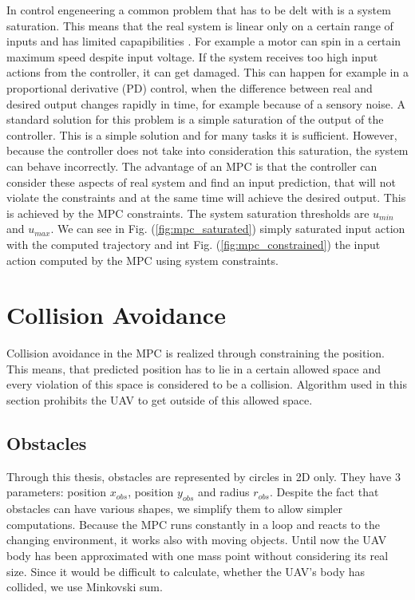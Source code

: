 \documentclass[a4paper,11pt,titlepage]{article}
\begin{document}
In control engeneering a common problem that has to be delt with is a system saturation. This means that the real system is linear only on a certain range of inputs and has limited capapibilities \cite{saturation}. For example a motor can spin in a certain maximum speed despite input voltage. If the system receives too high input actions from the controller, it can get damaged. This can happen for example in a proportional derivative (PD) control, when the difference between real and desired output changes rapidly in time, for example because of a sensory noise.
A standard  solution for this problem is a simple saturation of the output of the controller. This is a simple solution and for many tasks it is sufficient. However, because the controller does not take into consideration this saturation, the system can behave incorrectly.
The advantage of an MPC is that the controller can consider these aspects of real system and find an input prediction, that will not violate the constraints and at the same time will achieve the desired output. This is achieved by the MPC constraints. The system saturation thresholds are $u_{min}$ and $u_{max}$. We can see in Fig. (\ref{fig:mpc_saturated}) simply saturated input action with the computed trajectory and int Fig. (\ref{fig:mpc_constrained}) the input action computed by the MPC using system constraints. 

\section{Collision Avoidance}
Collision avoidance in the MPC is realized through constraining the position. This means, that predicted position has to lie in a certain allowed space and every violation of this space is considered to be a collision. Algorithm used in this section prohibits the UAV to get outside of this allowed space.

\subsection{Obstacles}
Through this thesis, obstacles are represented by circles in 2D only. They have 3 parameters: position $x_{obs}$, position $y_{obs}$ and radius $r_{obs}$. Despite the fact that obstacles can have various shapes, we simplify them to allow simpler computations. Because the MPC runs constantly in a loop and reacts to the changing environment, it works also with moving objects. Until now the UAV body has been approximated with one mass point without considering its real size. Since it would be difficult to calculate, whether the UAV's body has collided, we use Minkovski sum. 
\end{document}
